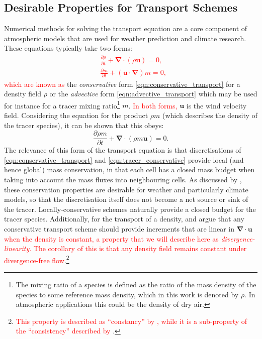 \documentclass{ametsocV6.1}
\newcommand{\pfrac}[2]{\frac{\partial{#1}}{\partial{#2}}}
\newcommand{\change}[1]{\textcolor{red}{#1}}
\begin{document}
\subsection{Desirable Properties for Transport Schemes}
Numerical methods for solving the transport equation are a core component of atmospheric models that are used for weather prediction and climate research.
These equations typically take two forms:
\change{
\begin{subequations}
\begin{align}
& \pfrac{\rho}{t} + \bm{\nabla\cdot}\left(\rho\bm{u}\right) = 0, \label{eqn:conservative_transport} \\
& \pfrac{m}{t} + \left(\bm{u\cdot\nabla}\right)m = 0, \label{eqn:advective_transport}
\end{align}
\end{subequations}}
\change{which are known as} the \textit{conservative} form \eqref{eqn:conservative_transport} for a density field $\rho$ or the \textit{advective} form \eqref{eqn:advective_transport} which may be used for instance for a tracer mixing ratio\footnote{The mixing ratio of a species is defined as the ratio of the mass density of the species to some reference mass density, which in this work is denoted by $\rho$. In atmospheric applications this could be the density of dry air.} $m$. 
\change{In both forms,} $\bm{u}$ is the wind velocity field.
Considering the equation for the product $\rho m$ (which describes the density of the tracer species), it can be shown that this obeys:
\begin{equation}
\pfrac{\rho m}{t} + \bm{\nabla\cdot}\left(\rho m\bm{u}\right) = 0. \label{eqn:tracer_conservative}
\end{equation}
The relevance of this form of the transport equation is that discretisations of \eqref{eqn:conservative_transport} and \eqref{eqn:tracer_conservative} provide local (and hence global) mass conservation, in that each cell has a closed mass budget when taking into account the mass fluxes into neighbouring cells.
As discussed by \cite{thuburn2008some}, these conservation properties are desirable for weather and particularly climate models, so that the discretisation itself does not become a net source or sink of the tracer.
Locally-conservative schemes naturally provide a closed budget for the tracer species. 
Additionally, for the transport of a density, \citet{lin1996ffsl} and \citet{melvin2024mixed} argue that any conservative transport scheme should provide increments that are linear in $\bm{\nabla\cdot u}$ \change{when the density is constant, a property that we will describe here as \textit{divergence-linearity}.
The corollary of this is that any density field remains constant under divergence-free flow}.\footnote{\change{This property is described as ``constancy'' by \citet{leonard1996cosmic}, while it is a sub-property of the ``consistency'' described by \citet{lin1996ffsl}}.}
\end{document}
